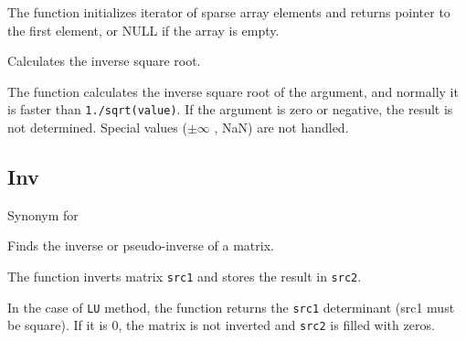 
\begin{description}
\end{description}

The function initializes iterator of
sparse array elements and returns pointer to the first element, or NULL
if the array is empty.

\fi

Calculates the inverse square root.


\begin{description}
\end{description}


The function calculates the inverse square root of the argument, and normally it is faster than \texttt{1./sqrt(value)}. If the argument is zero or negative, the result is not determined. Special values ($\pm \infty $ , NaN) are not handled.

\subsection{Inv}

Synonym for 

Finds the inverse or pseudo-inverse of a matrix.


\begin{description}
\end{description}

The function inverts matrix \texttt{src1} and stores the result in \texttt{src2}.

In the case of \texttt{LU} method, the function returns the \texttt{src1} determinant (src1 must be square). If it is 0, the matrix is not inverted and \texttt{src2} is filled with zeros.

